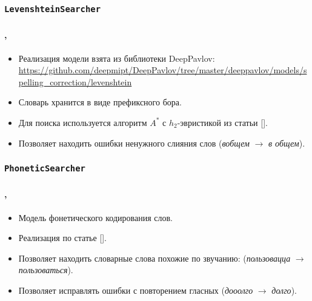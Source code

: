 \documentclass[t]{beamer}  %
\begin{document}
\subsubsection{\texttt{LevenshteinSearcher}}
\begin{frame}
	\frametitle{\insertsection} 
	\framesubtitle{\insertsubsection, \insertsubsubsection}
	
	\begin{itemize}
		\item Реализация модели взята из библиотеки DeepPavlov: \url{https://github.com/deepmipt/DeepPavlov/tree/master/deeppavlov/models/spelling_correction/levenshtein}
		\item Словарь хранится в виде префиксного бора.
		\item Для поиска используется алгоритм $A^*$ с $h_2$-эвристикой из статьи [\textcite{Oflazer1996}].
		\item Позволяет находить ошибки ненужного слияния слов (\textit{вобщем} $\rightarrow$ \textit{в общем}).
	\end{itemize}
\end{frame}

\subsubsection{\texttt{PhoneticSearcher}}
\begin{frame}
	\frametitle{\insertsection} 
	\framesubtitle{\insertsubsection, \insertsubsubsection}
	
	\begin{itemize}
		\item Модель фонетического кодирования слов.
		\item Реализация по статье [\textcite{Sorokin2016}].
		\item Позволяет находить словарные слова похожие по звучанию: (\textit{пользовацца} $\rightarrow$ \textit{пользоваться}).
		\item Позволяет исправлять ошибки с повторением гласных (\textit{дооолго} $\rightarrow$ \textit{долго}).
	\end{itemize}
\end{frame}
\end{document}
